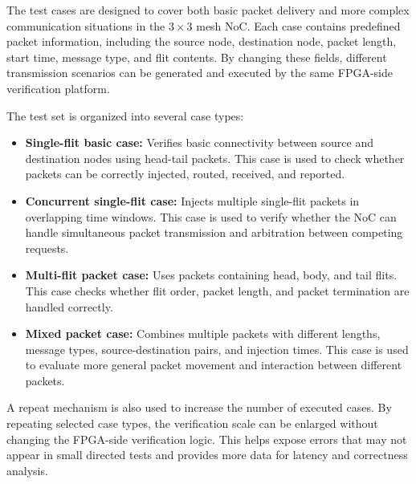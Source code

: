 The test cases are designed to cover both basic packet delivery and more complex communication situations in the $3 \times 3$ mesh NoC. Each case contains predefined packet information, including the source node, destination node, packet length, start time, message type, and flit contents. By changing these fields, different transmission scenarios can be generated and executed by the same FPGA-side verification platform.

The test set is organized into several case types:

\begin{itemize}
    \item \textbf{Single-flit basic case:} Verifies basic connectivity between source and destination nodes using head-tail packets. This case is used to check whether packets can be correctly injected, routed, received, and reported.

    \item \textbf{Concurrent single-flit case:} Injects multiple single-flit packets in overlapping time windows. This case is used to verify whether the NoC can handle simultaneous packet transmission and arbitration between competing requests.

    \item \textbf{Multi-flit packet case:} Uses packets containing head, body, and tail flits. This case checks whether flit order, packet length, and packet termination are handled correctly.

    \item \textbf{Mixed packet case:} Combines multiple packets with different lengths, message types, source-destination pairs, and injection times. This case is used to evaluate more general packet movement and interaction between different packets.
\end{itemize}

A repeat mechanism is also used to increase the number of executed cases. By repeating selected case types, the verification scale can be enlarged without changing the FPGA-side verification logic. This helps expose errors that may not appear in small directed tests and provides more data for latency and correctness analysis.
